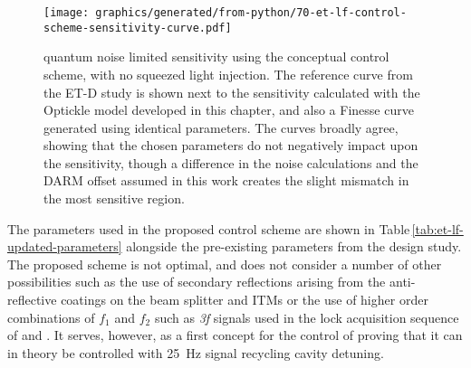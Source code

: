\begin{figure}
  \centering
  \texttt{[image: graphics/generated/from-python/70-et-lf-control-scheme-sensitivity-curve.pdf]}
  \caption[ET-LF quantum noise limited sensitivity using the conceptual control scheme]{\label{fig:et-lf-control-scheme-sensitivity}\ETLF{} quantum noise limited sensitivity using the conceptual control scheme, with no squeezed light injection. The reference curve from the ET-D study is shown next to the sensitivity calculated with the Optickle model developed in this chapter, and also a Finesse curve generated using identical parameters. The curves broadly agree, showing that the chosen parameters do not negatively impact upon the sensitivity, though a difference in the noise calculations and the \gls{DARM} offset assumed in this work creates the slight mismatch in the most sensitive region.}
\end{figure}

The parameters used in the proposed control scheme are shown in Table\,\ref{tab:et-lf-updated-parameters} alongside the pre-existing parameters from the design study. The proposed scheme is not optimal, and does not consider a number of other possibilities such as the use of secondary reflections arising from the anti-reflective coatings on the beam splitter and \glspl{ITM} or the use of higher order combinations of $f_1$ and $f_2$ such as \emph{3f} signals used in the lock acquisition sequence of \VIRGO{} \cite{Acernese2008} and \ALIGO{} \cite{Staley2014}. It serves, however, as a first concept for the control of \ETLF{} proving that it can in theory be controlled with \SI{25}{\hertz} signal recycling cavity detuning.

